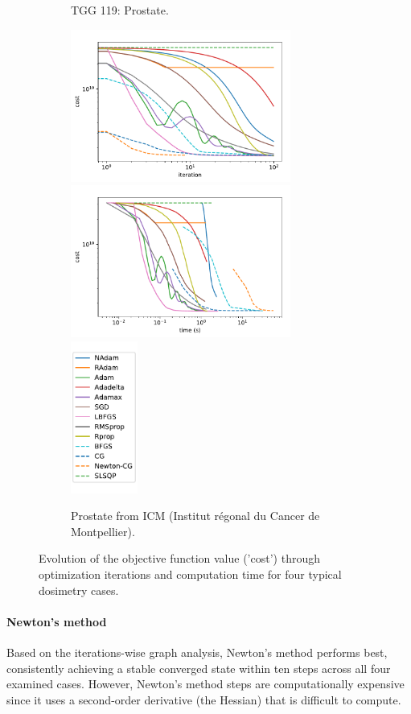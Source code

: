 \begin{figure}
\begin{subfigure}{\textwidth}
		\caption{TGG 119: Prostate.}
		\label{fig:TGG119_Prostate}
	\end{subfigure}
	\begin{subfigure}{\textwidth}
		\centering
		\includegraphics[height=5cm]{optimizers_comparison/ICMProstate-iter.pdf}
		\includegraphics[height=5cm]{optimizers_comparison/ICMProstate-time.pdf}
		\includegraphics[height=5cm]{optimizers_comparison/legend.pdf}
		\caption{Prostate from ICM (Institut régonal du Cancer de Montpellier).}
		\label{fig:ICM_Prostate}
	\end{subfigure}
	\caption{Evolution of the objective function value ('cost') through optimization iterations and computation time for four typical dosimetry cases.}
	\label{fig:OptimizersComparison}
\end{figure}

\paragraph{Newton's method}
Based on the iterations-wise graph analysis, Newton's method performs best, consistently achieving a stable converged state within ten steps across all four examined cases.
However, Newton's method steps are computationally expensive since it uses a second-order derivative (the Hessian) that is difficult to compute.

